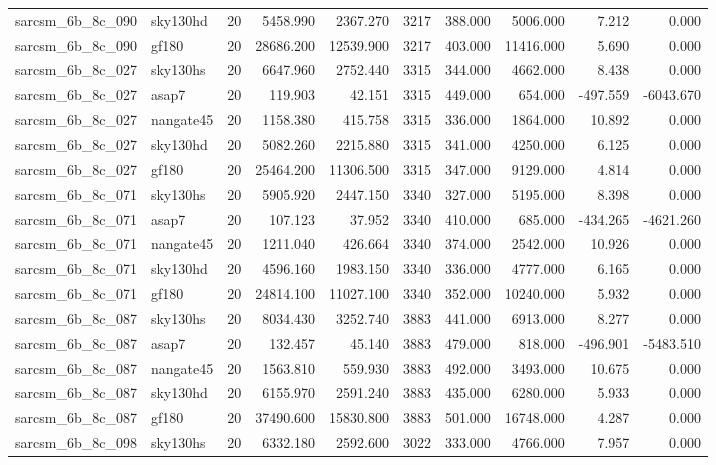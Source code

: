 \documentclass{article}
\begin{document}
\begin{longtable}{llrrrrrrrr}
sarcsm\_6b\_8c\_090 & sky130hd & 20 & 5458.990 & 2367.270 & 3217 & 388.000 & 5006.000 & 7.212 & 0.000 \\
sarcsm\_6b\_8c\_090 & gf180 & 20 & 28686.200 & 12539.900 & 3217 & 403.000 & 11416.000 & 5.690 & 0.000 \\
sarcsm\_6b\_8c\_027 & sky130hs & 20 & 6647.960 & 2752.440 & 3315 & 344.000 & 4662.000 & 8.438 & 0.000 \\
sarcsm\_6b\_8c\_027 & asap7 & 20 & 119.903 & 42.151 & 3315 & 449.000 & 654.000 & -497.559 & -6043.670 \\
sarcsm\_6b\_8c\_027 & nangate45 & 20 & 1158.380 & 415.758 & 3315 & 336.000 & 1864.000 & 10.892 & 0.000 \\
sarcsm\_6b\_8c\_027 & sky130hd & 20 & 5082.260 & 2215.880 & 3315 & 341.000 & 4250.000 & 6.125 & 0.000 \\
sarcsm\_6b\_8c\_027 & gf180 & 20 & 25464.200 & 11306.500 & 3315 & 347.000 & 9129.000 & 4.814 & 0.000 \\
sarcsm\_6b\_8c\_071 & sky130hs & 20 & 5905.920 & 2447.150 & 3340 & 327.000 & 5195.000 & 8.398 & 0.000 \\
sarcsm\_6b\_8c\_071 & asap7 & 20 & 107.123 & 37.952 & 3340 & 410.000 & 685.000 & -434.265 & -4621.260 \\
sarcsm\_6b\_8c\_071 & nangate45 & 20 & 1211.040 & 426.664 & 3340 & 374.000 & 2542.000 & 10.926 & 0.000 \\
sarcsm\_6b\_8c\_071 & sky130hd & 20 & 4596.160 & 1983.150 & 3340 & 336.000 & 4777.000 & 6.165 & 0.000 \\
sarcsm\_6b\_8c\_071 & gf180 & 20 & 24814.100 & 11027.100 & 3340 & 352.000 & 10240.000 & 5.932 & 0.000 \\
sarcsm\_6b\_8c\_087 & sky130hs & 20 & 8034.430 & 3252.740 & 3883 & 441.000 & 6913.000 & 8.277 & 0.000 \\
sarcsm\_6b\_8c\_087 & asap7 & 20 & 132.457 & 45.140 & 3883 & 479.000 & 818.000 & -496.901 & -5483.510 \\
sarcsm\_6b\_8c\_087 & nangate45 & 20 & 1563.810 & 559.930 & 3883 & 492.000 & 3493.000 & 10.675 & 0.000 \\
sarcsm\_6b\_8c\_087 & sky130hd & 20 & 6155.970 & 2591.240 & 3883 & 435.000 & 6280.000 & 5.933 & 0.000 \\
sarcsm\_6b\_8c\_087 & gf180 & 20 & 37490.600 & 15830.800 & 3883 & 501.000 & 16748.000 & 4.287 & 0.000 \\
sarcsm\_6b\_8c\_098 & sky130hs & 20 & 6332.180 & 2592.600 & 3022 & 333.000 & 4766.000 & 7.957 & 0.000 \\

\end{longtable}
\end{document}
